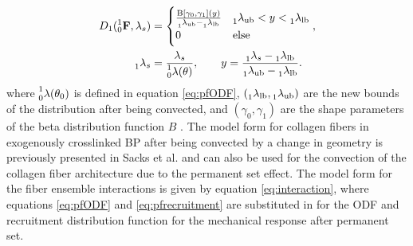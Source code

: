 \begin{equation} \label{eq:pfrecruitment}
\begin{gathered}
D_1(\prescript{1}{0}{\mathbf{F}}, \lambda_s) = \begin{cases} \frac{\operatorname{B}[\gamma_0,\gamma_1](y)}{\prescript{}{1}{\lambda}_\mathrm{ub}-\prescript{}{1}{\lambda}_\mathrm{lb}} & \prescript{}{1}{\lambda}_\mathrm{ub} < y < \prescript{}{1}{\lambda}_\mathrm{lb} \\ 0 & \text{else}\end{cases}, \\
\qquad \prescript{}{1}{\lambda}_s = \frac{\lambda_s}{\prescript{1}{0}{\lambda}(\theta)}, \qquad y = \frac{\prescript{}{1}{\lambda}_s - \prescript{}{1}{\lambda}_\mathrm{lb}}{\prescript{}{1}{\lambda}_\mathrm{ub}-\prescript{}{1}{\lambda}_\mathrm{lb}}.
\end{gathered}
\end{equation}
where $\prescript{1}{0}{\lambda(\theta_0)}$ is defined in equation \ref{eq:pfODF}, $(\prescript{}{1}{\lambda}_\mathrm{lb},\prescript{}{1}{\lambda}_\mathrm{ub})$ are the new bounds of the distribution after being convected, and $(\gamma_0,\gamma_1)$ are the shape parameters of the beta distribution function $B$ .
The model form for collagen fibers in exogenously crosslinked BP after being convected by a change in geometry is previously presented in Sacks et al. \cite{sacks_novel_2016} and can also be used for the convection of the collagen fiber architecture due to the permanent set effect. 
The model form for the fiber ensemble interactions is given by equation \ref{eq:interaction}, where equations \ref{eq:pfODF} and \ref{eq:pfrecruitment} are substituted in for the ODF and recruitment distribution function for the mechanical response after permanent set.
